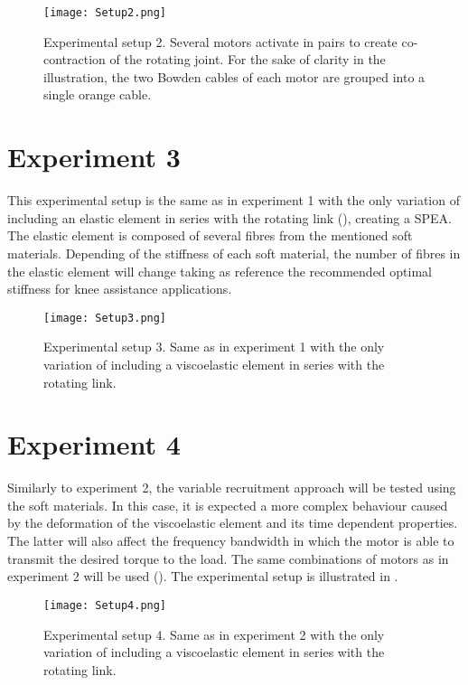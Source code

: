 \begin{figure}[hbt!]
    \centering
    \texttt{[image: Setup2.png]}
    \caption{Experimental setup 2. Several motors activate in pairs to create co-contraction of the rotating joint. For the sake of clarity in the illustration, the two Bowden cables of each motor are grouped into a single orange cable.}
    \label{fig:setup2}
\end{figure}

\section{Experiment 3}

This experimental setup is the same as in experiment 1 with the only variation of including an elastic element in series with the rotating link (), creating a SPEA. The elastic element is composed of several fibres from the mentioned soft materials. Depending of the stiffness of each soft material, the number of fibres in the elastic element will change taking as reference the recommended optimal stiffness for knee assistance applications. 

\begin{figure}[hbt!]
    \centering
    \texttt{[image: Setup3.png]}
    \caption{Experimental setup 3. Same as in experiment 1 with the only variation of including a viscoelastic element in series with the rotating link.}
    \label{fig:setup3}
\end{figure}

\section{Experiment 4}

Similarly to experiment 2, the variable recruitment approach will be tested using the soft materials. In this case, it is expected a more complex behaviour caused by the deformation of the viscoelastic element and its time dependent properties. The latter will also affect the frequency bandwidth in which the motor is able to transmit the desired torque to the load. The same combinations of motors as in experiment 2 will be used (). The experimental setup is illustrated in .

\begin{figure}[hbt!]
    \centering
    \texttt{[image: Setup4.png]}
    \caption{Experimental setup 4. Same as in experiment 2 with the only variation of including a viscoelastic element in series with the rotating link.}
    \label{fig:setup4}
\end{figure}
